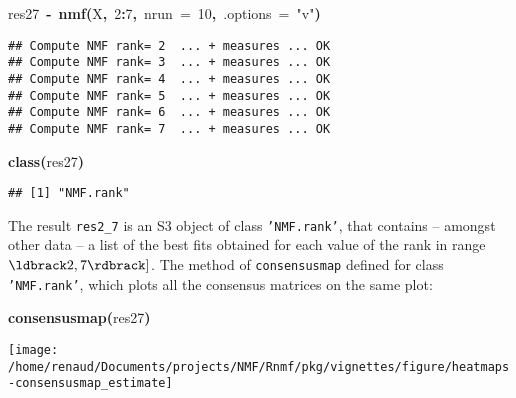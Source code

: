 \documentclass[a4paper]{article}\usepackage{graphicx, color}
\makeatletter
\def\maxwidth{ %
  \ifdim\Gin@nat@width>\linewidth
    \linewidth
  \else
    \Gin@nat@width
  \fi
}
\newcommand{\hlnumber}[1]{\textcolor[rgb]{0,0,0}{#1}}%
\newcommand{\hlfunctioncall}[1]{\textcolor[rgb]{0.501960784313725,0,0.329411764705882}{\textbf{#1}}}%
\newcommand{\hlstring}[1]{\textcolor[rgb]{0.6,0.6,1}{#1}}%
\newcommand{\hlkeyword}[1]{\textcolor[rgb]{0,0,0}{\textbf{#1}}}%
\newcommand{\hlargument}[1]{\textcolor[rgb]{0.690196078431373,0.250980392156863,0.0196078431372549}{#1}}%
\newcommand{\hlassignement}[1]{\textcolor[rgb]{0,0,0}{\textbf{#1}}}%
\newcommand{\hlsymbol}[1]{\textcolor[rgb]{0,0,0}{#1}}%
\newenvironment{kframe}{%
 \def\FrameCommand##1{\hskip\@totalleftmargin \hskip-\fboxsep
 \colorbox{shadecolor}{##1}\hskip-\fboxsep
     \hskip-\linewidth \hskip-\@totalleftmargin \hskip\columnwidth}%
 \MakeFramed {\advance\hsize-\width
   \@totalleftmargin\z@ \linewidth\hsize
   \@setminipage}}%
 {\par\unskip\endMakeFramed}
\newenvironment{knitrout}{}{} %
\let\code=\texttt
\makeatother
\begin{document}
\begin{knitrout}
\color{fgcolor}\begin{kframe}
\begin{flushleft}
\ttfamily\noindent
\hlsymbol{res2\usebox{\hlnormalsizeboxunderscore}7}{\ }\hlassignement{\usebox{\hlnormalsizeboxlessthan}-}{\ }\hlfunctioncall{nmf}\hlkeyword{(}\hlsymbol{X}\hlkeyword{,}{\ }\hlnumber{2}\hlkeyword{:}\hlnumber{7}\hlkeyword{,}{\ }\hlargument{nrun}{\ }\hlargument{=}{\ }\hlnumber{10}\hlkeyword{,}{\ }\hlargument{.options}{\ }\hlargument{=}{\ }\hlstring{"{}v"{}}\hlkeyword{)}\mbox{}
\normalfont
\end{flushleft}
\begin{verbatim}
## Compute NMF rank= 2  ... + measures ... OK
## Compute NMF rank= 3  ... + measures ... OK
## Compute NMF rank= 4  ... + measures ... OK
## Compute NMF rank= 5  ... + measures ... OK
## Compute NMF rank= 6  ... + measures ... OK
## Compute NMF rank= 7  ... + measures ... OK
\end{verbatim}
\begin{flushleft}
\ttfamily\noindent
\hlfunctioncall{class}\hlkeyword{(}\hlsymbol{res2\usebox{\hlnormalsizeboxunderscore}7}\hlkeyword{)}\mbox{}
\normalfont
\end{flushleft}
\begin{verbatim}
## [1] "NMF.rank"
\end{verbatim}
\end{kframe}
\end{knitrout}


The result \code{res2\_7} is an S3 object of class \code{'NMF.rank'}, 
that contains -- amongst other data -- a list of the best fits obtained for each 
value of the rank in range $\ldbrack 2, 7\rdbrack]$.
The method of \code{consensusmap} defined for class \code{'NMF.rank'}, 
which plots all the consensus matrices on the same plot: 

\begin{knitrout}
\color{fgcolor}\begin{kframe}
\begin{flushleft}
\ttfamily\noindent
\hlfunctioncall{consensusmap}\hlkeyword{(}\hlsymbol{res2\usebox{\hlnormalsizeboxunderscore}7}\hlkeyword{)}\mbox{}
\normalfont
\end{flushleft}
\end{kframe}\texttt{[image: /home/renaud/Documents/projects/NMF/Rnmf/pkg/vignettes/figure/heatmaps-consensusmap\_estimate]} 
\end{knitrout}
\end{document}
